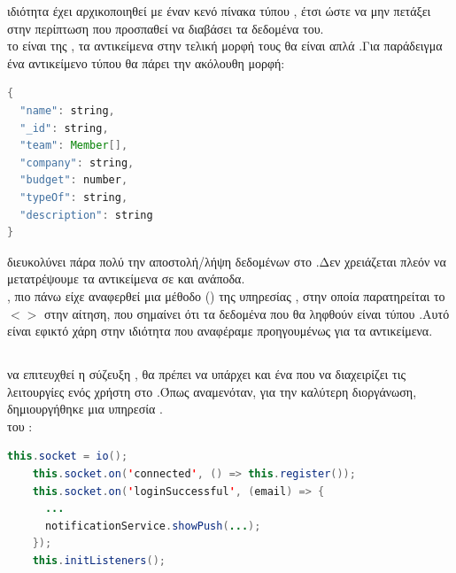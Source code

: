  ιδιότητα  έχει αρχικοποιηθεί με έναν κενό πίνακα τύπου , έτσι ώστε να μην πετάξει  στην περίπτωση που προσπαθεί να διαβάσει τα δεδομένα του.\\
 το  είναι  της , τα αντικείμενα στην τελική μορφή τους θα είναι απλά .Για παράδειγμα ένα αντικείμενο τύπου  θα πάρει την ακόλουθη μορφή:\\
	\begin{lstlisting}[language=Java]
{ 
  "name": string,
  "_id": string,
  "team": Member[],
  "company": string,
  "budget": number,
  "typeOf": string,
  "description": string
}
	\end{lstlisting}
 διευκολύνει πάρα πολύ την αποστολή/λήψη δεδομένων στο .Δεν χρειάζεται πλεόν να μετατρέψουμε τα αντικείμενα σε  και ανάποδα.\\
, πιο πάνω είχε αναφερθεί μια μέθοδο () της υπηρεσίας , στην οποία παρατηρείται το $<$$>$ στην αίτηση, που σημαίνει ότι τα δεδομένα που θα ληφθούν είναι τύπου .Αυτό είναι εφικτό χάρη στην ιδιότητα που αναφέραμε προηγουμένως για τα αντικείμενα. 

\subsection*{}

 να επιτευχθεί η σύζευξη , θα πρέπει να υπάρχει και ένα  που να διαχειρίζει τις λειτουργίες ενός χρήστη στο .Όπως αναμενόταν, για την καλύτερη διοργάνωση, δημιουργήθηκε μια υπηρεσία .\\
  του :\\

	\begin{lstlisting}[language=Java]
this.socket = io();
    this.socket.on('connected', () => this.register());
    this.socket.on('loginSuccessful', (email) => {
      ...
      notificationService.showPush(...);
    });
    this.initListeners();
	\end{lstlisting}

